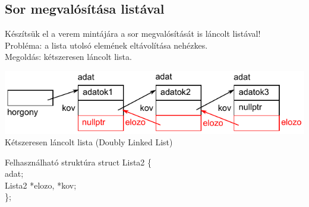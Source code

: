 \documentclass[usenames,dvipsnames,aspectratio=169]{beamer}
\begin{document}
\subsection{Sor megvalósítása listával}
\begin{frame}
  \small
  Készítsük el a verem mintájára a sor megvalósítását is láncolt listával!\\
  Probléma: a lista utolsó elemének eltávolítása nehézkes.\\
  Megoldás: kétszeresen láncolt lista.
  \begin{center}
    \includegraphics[scale=0.8]{list2.pdf} \\
    \tiny
    Kétszeresen láncolt lista (Doubly Linked List)
  \end{center}
  \begin{exampleblock}{Felhasználható struktúra}
    \scriptsize
    struct Lista2 \{\\    
    \qquad {} adat;\\
    \qquad Lista2 *elozo, *kov;\\
    \};\\
  \end{exampleblock}
\end{frame}

\begin{frame}
  \scriptsize
  \begin{columns}[T]
      \begin{exampleblock}{}
        \scriptsize
        \vspace{-0.2cm}
        
        \vspace{-0.2cm}
      \end{exampleblock}
      \begin{exampleblock}{}
        \small
        
      \end{exampleblock}
  \end{columns}
\end{frame}
\end{document}
